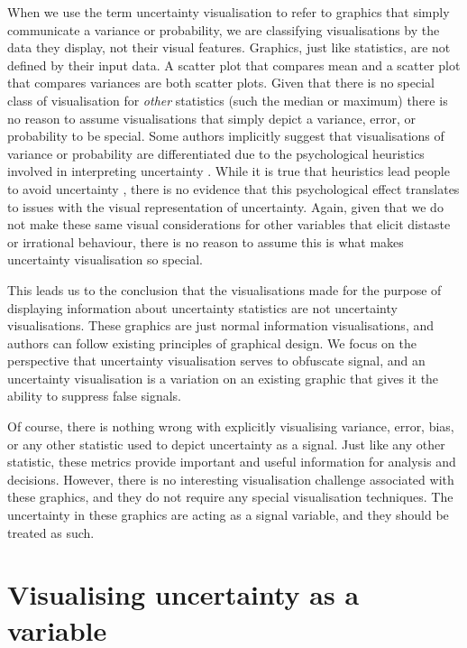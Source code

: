 \documentclass[
  12pt]{article}
\begin{document}
When we use the term uncertainty visualisation to refer to graphics that
simply communicate a variance or probability, we are classifying
visualisations by the data they display, not their visual features.
Graphics, just like statistics, are not defined by their input data. A
scatter plot that compares mean and a scatter plot that compares
variances are both scatter plots. Given that there is no special class
of visualisation for \emph{other} statistics (such the median or
maximum) there is no reason to assume visualisations that simply depict
a variance, error, or probability to be special. Some authors implicitly
suggest that visualisations of variance or probability are
differentiated due to the psychological heuristics involved in
interpreting uncertainty \citep{Hullman2019}. While it is true that
heuristics lead people to avoid uncertainty \citep{Spiegelhalter2017},
there is no evidence that this psychological effect translates to issues
with the visual representation of uncertainty. Again, given that we do
not make these same visual considerations for other variables that
elicit distaste or irrational behaviour, there is no reason to assume
this is what makes uncertainty visualisation so special.

This leads us to the conclusion that the visualisations made for the
purpose of displaying information about uncertainty statistics are not
uncertainty visualisations. These graphics are just normal information
visualisations, and authors can follow existing principles of graphical
design. We focus on the perspective that uncertainty visualisation
serves to obfuscate signal, and an uncertainty visualisation is a
variation on an existing graphic that gives it the ability to suppress
false signals.

Of course, there is nothing wrong with explicitly visualising variance,
error, bias, or any other statistic used to depict uncertainty as a
signal. Just like any other statistic, these metrics provide important
and useful information for analysis and decisions. However, there is no
interesting visualisation challenge associated with these graphics, and
they do not require any special visualisation techniques. The
uncertainty in these graphics are acting as a signal variable, and they
should be treated as such.

\section{Visualising uncertainty as a
variable}\label{visualising-uncertainty-as-a-variable}
\end{document}
